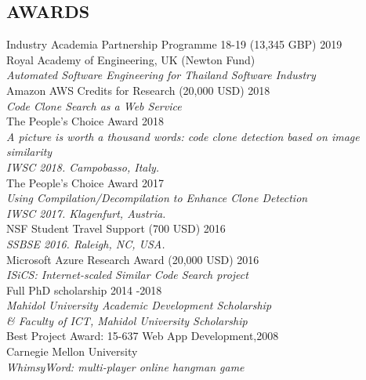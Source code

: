 \documentclass[margin, 10pt]{res} %
\begin{document}
\begin{resume}
\section{AWARDS}
Industry Academia Partnership Programme 18-19 (13,345 GBP) \hfill 2019 \\ 
Royal Academy of Engineering, UK (Newton Fund) \vspace{2mm} \\
\textit{Automated Software Engineering for Thailand Software Industry} \vspace{2mm} \\
Amazon AWS Credits for Research (20,000 USD) \hfill 2018 \\ 
\textit{Code Clone Search as a Web Service} \vspace{2mm} \\
The People's Choice Award \hfill 2018 \\ 
\textit{A picture is worth a thousand words: code clone detection based on image similarity} \\
\textit{IWSC 2018. Campobasso, Italy.} \vspace{2mm} \\
The People's Choice Award \hfill 2017 \\ 
\textit{Using Compilation/Decompilation to Enhance Clone Detection} \\
\textit{IWSC 2017. Klagenfurt, Austria.} \vspace{2mm} \\
NSF Student Travel Support (700 USD) \hfill 2016 \\ 
\textit{SSBSE 2016. Raleigh, NC, USA.} \vspace{2mm} \\
Microsoft Azure Research Award (20,000 USD) \hfill 2016 \\ 
\textit{ISiCS: Internet-scaled Similar Code Search project} \vspace{2mm} \\
Full PhD scholarship \hfill 2014 -2018 \\
\textit{Mahidol University Academic Development Scholarship \\ 
\& Faculty of ICT, Mahidol University Scholarship} \vspace{2mm} \\
Best Project Award: 15-637 Web App Development,\hfill 2008 \\Carnegie Mellon University \\ 
\textit{WhimsyWord: multi-player online hangman game} \vspace{2mm} \\

\end{resume}
\end{document}
